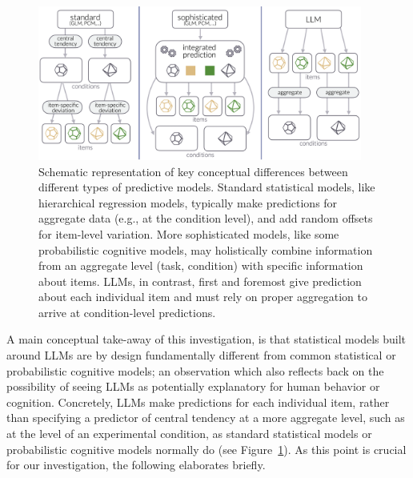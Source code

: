 \documentclass[fleqn]{article}
\begin{document}
\begin{figure}[t]
  \centering
  \includegraphics[width = 0.95\textwidth]{00-pics/condition-item-level-prediction.png}
  \caption{
    Schematic representation of key conceptual differences between different types of predictive models.
    Standard statistical models, like hierarchical regression models, typically make predictions for aggregate data (e.g., at the condition level), and add random offsets for item-level variation.
    More sophisticated models, like some probabilistic cognitive models, may holistically combine information from an aggregate level (task, condition) with specific information about items.
    LLMs, in contrast, first and foremost give prediction about each individual item and must rely on proper aggregation to arrive at condition-level predictions.
  }
  \label{fig:stats-model-types}
\end{figure}

A main conceptual take-away of this investigation, is that statistical models built around LLMs are by design fundamentally different from common statistical or probabilistic cognitive models; an observation which also reflects back on the possibility of seeing LLMs as potentially explanatory for human behavior or cognition.
Concretely, LLMs make predictions for each individual item, rather than specifying a predictor of central tendency at a more aggregate level, such as at the level of an experimental condition, as standard statistical models or probabilistic cognitive models normally do (see Figure~\ref{fig:stats-model-types}).
As this point is crucial for our investigation, the following elaborates briefly.
\end{document}
